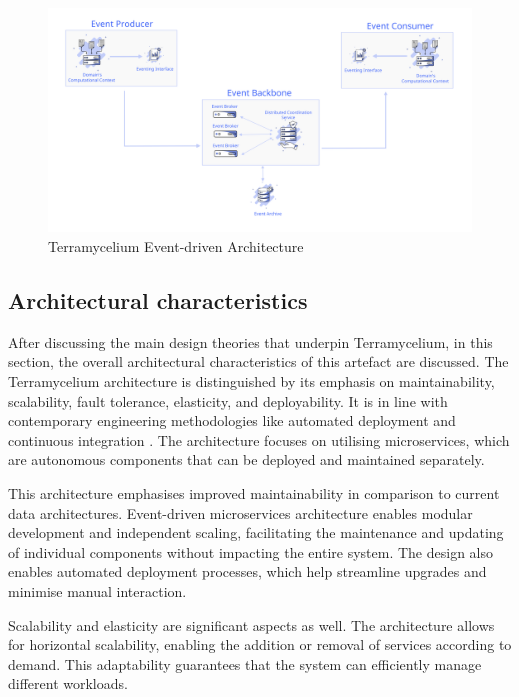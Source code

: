 \documentclass[preprint,12pt]{elsarticle}
\begin{document}
\begin{figure}[ht]

  \centering

  \includegraphics[width=13cm]{images/Event-architecture.png}

  \caption{Terramycelium Event-driven Architecture}

  \label{fig:eventDrivenArchitecture}

\end{figure}

\subsection{Architectural characteristics}

After discussing the main design theories that underpin Terramycelium, in this section, the overall architectural characteristics of this artefact are discussed. The Terramycelium architecture is distinguished by its emphasis on maintainability, scalability, fault tolerance, elasticity, and deployability. It is in line with contemporary engineering methodologies like automated deployment and continuous integration \cite{Ford2021SoftwareArchitecture}. The architecture focuses on utilising microservices, which are autonomous components that can be deployed and maintained separately.

This architecture emphasises improved maintainability in comparison to current data architectures. Event-driven microservices architecture enables modular development and independent scaling, facilitating the maintenance and updating of individual components without impacting the entire system. The design also enables automated deployment processes, which help streamline upgrades and minimise manual interaction.



Scalability and elasticity are significant aspects as well. The architecture allows for horizontal scalability, enabling the addition or removal of services according to demand. This adaptability guarantees that the system can efficiently manage different workloads.
\end{document}
